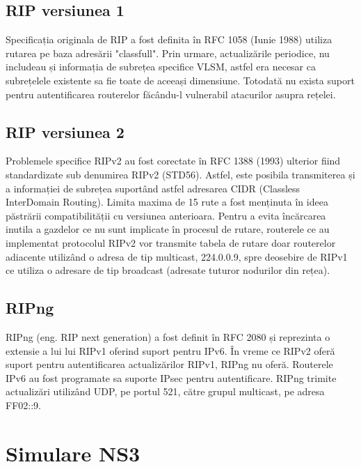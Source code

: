 \documentclass[12pt, a4paper, oneside, romanian]{teza-upb}
\begin{document}
\subsection{RIP versiunea 1}
Specificația originala de RIP a fost definita în RFC 1058 (Iunie 1988) utiliza rutarea pe baza adresării "classfull". Prin urmare, actualizările periodice, nu includeau și informația de subrețea specifice VLSM, astfel era necesar ca subrețelele existente sa fie toate de aceeași dimensiune. Totodată nu exista suport pentru autentificarea routerelor făcându-l vulnerabil atacurilor asupra rețelei.

\subsection{RIP versiunea 2}
Problemele specifice RIPv2 au fost corectate în RFC 1388 (1993) ulterior fiind standardizate sub denumirea RIPv2 (STD56). Astfel, este posibila transmiterea și a informației de subrețea suportând astfel adresarea CIDR (Classless InterDomain Routing). Limita maxima de 15 rute a fost menținuta în ideea păstrării compatibilității cu versiunea anterioara. Pentru a evita încărcarea inutila a gazdelor ce nu sunt implicate în procesul de rutare, routerele ce au implementat protocolul RIPv2 vor transmite tabela de rutare doar routerelor adiacente utilizând o adresa de tip multicast, 224.0.0.9, spre deosebire de RIPv1 ce utiliza o adresare de tip broadcast (adresate tuturor nodurilor din rețea).

\subsection{RIPng}
RIPng (eng. RIP next generation) a fost definit în RFC 2080 și reprezinta o extensie a lui lui RIPv1 oferind suport pentru IPv6. În vreme ce RIPv2 oferă suport pentru autentificarea actualizărilor RIPv1, RIPng nu oferă. Routerele IPv6 au fost programate sa suporte IPsec pentru autentificare. RIPng trimite actualizări utilizând UDP, pe portul 521, către grupul multicast, pe adresa FF02::9.
\vspace{0.1cm}
\section{Simulare NS3}
\end{document}
